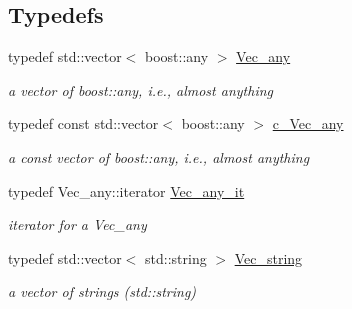 \subsection*{Typedefs}
\begin{DoxyCompactItemize}
\item 
\mbox{\label{group___s_m_s__types_ga58ded0963812566c064a5177b2f84c28}} 
typedef std\+::vector$<$ boost\+::any $>$ \mbox{\hyperlink{group___s_m_s__types_ga58ded0963812566c064a5177b2f84c28}{Vec\+\_\+any}}
\begin{DoxyCompactList}\small\item\em a vector of boost\+::any, i.\+e., almost anything \end{DoxyCompactList}\item 
\mbox{\label{group___s_m_s__types_gaa16aeddc7a50d64299ee0f8d9ca5dc7d}} 
typedef const std\+::vector$<$ boost\+::any $>$ \mbox{\hyperlink{group___s_m_s__types_gaa16aeddc7a50d64299ee0f8d9ca5dc7d}{c\+\_\+\+Vec\+\_\+any}}
\begin{DoxyCompactList}\small\item\em a const vector of boost\+::any, i.\+e., almost anything \end{DoxyCompactList}\item 
\mbox{\label{group___s_m_s__types_ga8dc169a813140dc233f5157dc574e753}} 
typedef Vec\+\_\+any\+::iterator \mbox{\hyperlink{group___s_m_s__types_ga8dc169a813140dc233f5157dc574e753}{Vec\+\_\+any\+\_\+it}}
\begin{DoxyCompactList}\small\item\em iterator for a Vec\+\_\+any \end{DoxyCompactList}\item 
\mbox{\label{group___s_m_s__types_ga36068d46bc6e7ba661efe0093c7a8beb}} 
typedef std\+::vector$<$ std\+::string $>$ \mbox{\hyperlink{group___s_m_s__types_ga36068d46bc6e7ba661efe0093c7a8beb}{Vec\+\_\+string}}
\begin{DoxyCompactList}\small\item\em a vector of strings (std\+::string) \end{DoxyCompactList}\item 
\mbox{\label{group___s_m_s__types_ga783dae6575f12fd7e90ad2edbf10f55c}} 

\end{DoxyCompactItemize}
